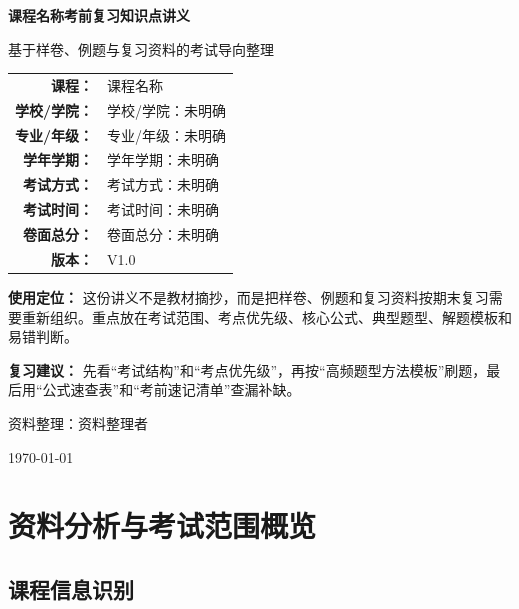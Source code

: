 \documentclass[UTF8,zihao=-4]{ctexart}
\newcommand{\CourseName}{课程名称}
\newcommand{\NoteTitle}{\CourseName 考前复习知识点讲义}
\newcommand{\NoteSubtitle}{基于样卷、例题与复习资料的考试导向整理}
\newcommand{\SchoolInfo}{学校/学院：未明确}
\newcommand{\MajorInfo}{专业/年级：未明确}
\newcommand{\TermInfo}{学年学期：未明确}
\newcommand{\ExamType}{考试方式：未明确}
\newcommand{\ExamTime}{考试时间：未明确}
\newcommand{\TotalScore}{卷面总分：未明确}
\newcommand{\AuthorName}{资料整理者}
\newcommand{\Version}{V1.0}
\begin{document}
\begin{titlepage}
\centering
\vspace*{2.5cm}

{\Huge\bfseries\sffamily \NoteTitle\par}
\vspace{0.8cm}
{\Large \NoteSubtitle\par}

\vspace{0.8cm}
\begin{tabular}{rl}
\textbf{课程：} & \CourseName \\
\textbf{学校/学院：} & \SchoolInfo \\
\textbf{专业/年级：} & \MajorInfo \\
\textbf{学年学期：} & \TermInfo \\
\textbf{考试方式：} & \ExamType \\
\textbf{考试时间：} & \ExamTime \\
\textbf{卷面总分：} & \TotalScore \\
\textbf{版本：} & \Version \\
\end{tabular}

\vfill
\begin{tcolorbox}[colback=lightblue,colframe=mainblue,width=0.86\textwidth,arc=2mm]
\textbf{使用定位：}
这份讲义不是教材摘抄，而是把样卷、例题和复习资料按期末复习需要重新组织。重点放在考试范围、考点优先级、核心公式、典型题型、解题模板和易错判断。\par

\textbf{复习建议：}
先看“考试结构”和“考点优先级”，再按“高频题型方法模板”刷题，最后用“公式速查表”和“考前速记清单”查漏补缺。
\end{tcolorbox}

\vfill
{\large 资料整理：\AuthorName\par}
{\large \today\par}
\end{titlepage}

\tableofcontents
\newpage

\section{资料分析与考试范围概览}

\subsection{课程信息识别}
\end{document}

